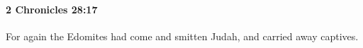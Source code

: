 
		\paragraph{2 Chronicles 28:17} %
			\label{2CHRONICLES-28-17}

			For again the Edomites had come and smitten Judah, and carried away captives.


